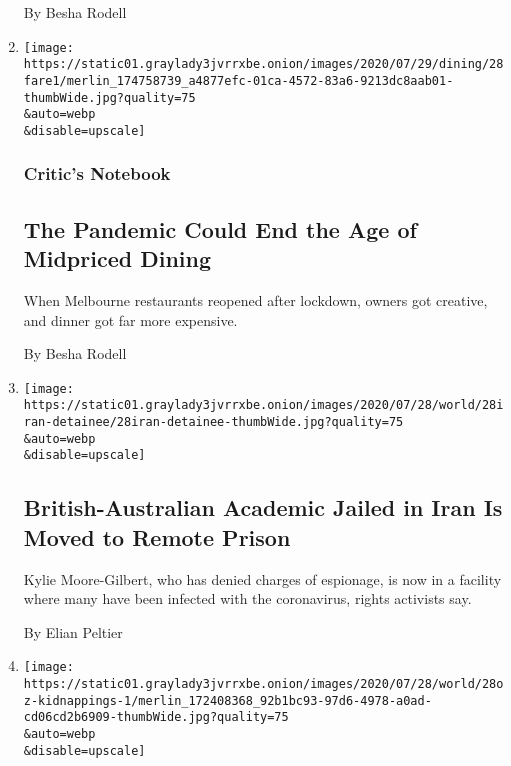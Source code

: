 \begin{enumerate}
  By Besha Rodell
\item
  \href{/2020/07/28/dining/melbourne-restaurants-coronavirus.html}{}

  \texttt{[image: https://static01.graylady3jvrrxbe.onion/images/2020/07/29/dining/28fare1/merlin\_174758739\_a4877efc-01ca-4572-83a6-9213dc8aab01-thumbWide.jpg?quality=75\\\&auto=webp\\\&disable=upscale]}

  \hypertarget{critics-notebook}{%
  \subsubsection{Critic's Notebook}\label{critics-notebook}}

  \hypertarget{the-pandemic-could-end-the-age-of-midpriced-dining}{%
  \subsection{The Pandemic Could End the Age of Midpriced
  Dining}\label{the-pandemic-could-end-the-age-of-midpriced-dining}}

  When Melbourne restaurants reopened after lockdown, owners got
  creative, and dinner got far more expensive.

  By Besha Rodell
\item
  \href{/2020/07/28/world/europe/british-australian-academic-jail-iran-qarchak.html}{}

  \texttt{[image: https://static01.graylady3jvrrxbe.onion/images/2020/07/28/world/28iran-detainee/28iran-detainee-thumbWide.jpg?quality=75\\\&auto=webp\\\&disable=upscale]}

  \hypertarget{british-australian-academic-jailed-in-iran-is-moved-to-remote-prison}{%
  \subsection{British-Australian Academic Jailed in Iran Is Moved to
  Remote
  Prison}\label{british-australian-academic-jailed-in-iran-is-moved-to-remote-prison}}

  Kylie Moore-Gilbert, who has denied charges of espionage, is now in a
  facility where many have been infected with the coronavirus, rights
  activists say.

  By Elian Peltier
\item
  \href{/2020/07/28/world/australia/chinese-students-virtual-kidnapping.html}{}

  \texttt{[image: https://static01.graylady3jvrrxbe.onion/images/2020/07/28/world/28oz-kidnappings-1/merlin\_172408368\_92b1bc93-97d6-4978-a0ad-cd06cd2b6909-thumbWide.jpg?quality=75\\\&auto=webp\\\&disable=upscale]}


\end{enumerate}
